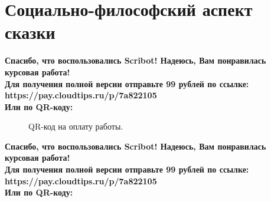 \documentclass{article}
\begin{document}
\section{Социально-философский аспект сказки}
\begin{center}
    \textbf{
        Спасибо, что воспользовались Scribot! Надеюсь, Вам понравилась курсовая работа!\\
        Для получения полной версии отправьте 99 рублей по ссылке:\\
        https://pay.cloudtips.ru/p/7a822105\\
        Или по QR-коду:\\
    }
\end{center}
\begin{figure}[h]
    \caption{QR-код на оплату работы.}
    \label{ris:image}
\end{figure}
\newpage
\begin{center}
    \textbf{
        Спасибо, что воспользовались Scribot! Надеюсь, Вам понравилась курсовая работа!\\
        Для получения полной версии отправьте 99 рублей по ссылке:\\
        https://pay.cloudtips.ru/p/7a822105\\
        Или по QR-коду:\\
    }
\end{center}
\end{document}
